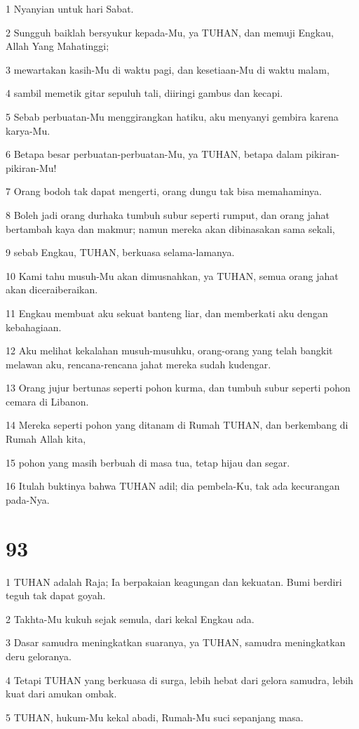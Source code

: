 \par 1 Nyanyian untuk hari Sabat.
\par 2 Sungguh baiklah bersyukur kepada-Mu, ya TUHAN, dan memuji Engkau, Allah Yang Mahatinggi;
\par 3 mewartakan kasih-Mu di waktu pagi, dan kesetiaan-Mu di waktu malam,
\par 4 sambil memetik gitar sepuluh tali, diiringi gambus dan kecapi.
\par 5 Sebab perbuatan-Mu menggirangkan hatiku, aku menyanyi gembira karena karya-Mu.
\par 6 Betapa besar perbuatan-perbuatan-Mu, ya TUHAN, betapa dalam pikiran-pikiran-Mu!
\par 7 Orang bodoh tak dapat mengerti, orang dungu tak bisa memahaminya.
\par 8 Boleh jadi orang durhaka tumbuh subur seperti rumput, dan orang jahat bertambah kaya dan makmur; namun mereka akan dibinasakan sama sekali,
\par 9 sebab Engkau, TUHAN, berkuasa selama-lamanya.
\par 10 Kami tahu musuh-Mu akan dimusnahkan, ya TUHAN, semua orang jahat akan diceraiberaikan.
\par 11 Engkau membuat aku sekuat banteng liar, dan memberkati aku dengan kebahagiaan.
\par 12 Aku melihat kekalahan musuh-musuhku, orang-orang yang telah bangkit melawan aku, rencana-rencana jahat mereka sudah kudengar.
\par 13 Orang jujur bertunas seperti pohon kurma, dan tumbuh subur seperti pohon cemara di Libanon.
\par 14 Mereka seperti pohon yang ditanam di Rumah TUHAN, dan berkembang di Rumah Allah kita,
\par 15 pohon yang masih berbuah di masa tua, tetap hijau dan segar.
\par 16 Itulah buktinya bahwa TUHAN adil; dia pembela-Ku, tak ada kecurangan pada-Nya.

\chapter{93}

\par 1 TUHAN adalah Raja; Ia berpakaian keagungan dan kekuatan. Bumi berdiri teguh tak dapat goyah.
\par 2 Takhta-Mu kukuh sejak semula, dari kekal Engkau ada.
\par 3 Dasar samudra meningkatkan suaranya, ya TUHAN, samudra meningkatkan deru geloranya.
\par 4 Tetapi TUHAN yang berkuasa di surga, lebih hebat dari gelora samudra, lebih kuat dari amukan ombak.
\par 5 TUHAN, hukum-Mu kekal abadi, Rumah-Mu suci sepanjang masa.

